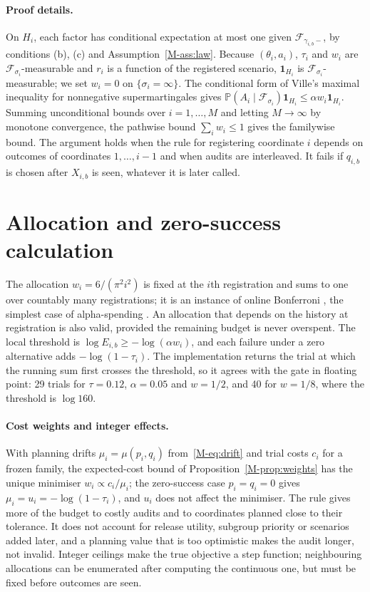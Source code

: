 \documentclass{jpc}
\newcommand{\F}{\mathcal F}
\newcommand{\Prob}{\mathbb P}
\begin{document}
\paragraph{Proof details.} On $H_i$, each factor has conditional expectation at most one given $\F_{\gamma_{i,b}-}$, by conditions (b), (c) and Assumption~\ref{M-ass:law}. Because $(\theta_i,a_i)$, $\tau_i$ and $w_i$ are $\F_{\sigma_i}$-measurable and $r_i$ is a function of the registered scenario, $\mathbf 1_{H_i}$ is $\F_{\sigma_i}$-measurable; we set $w_i=0$ on $\{\sigma_i=\infty\}$. The conditional form of Ville's maximal inequality for nonnegative supermartingales \cite{ville1939} gives $\Prob(A_i\mid\F_{\sigma_i})\mathbf 1_{H_i}\le\alpha w_i\mathbf 1_{H_i}$. Summing unconditional bounds over $i=1,\ldots,M$ and letting $M\to\infty$ by monotone convergence, the pathwise bound $\sum_iw_i\le1$ gives the familywise bound. The argument holds when the rule for registering coordinate $i$ depends on outcomes of coordinates $1,\ldots,i-1$ and when audits are interleaved. It fails if $q_{i,b}$ is chosen after $X_{i,b}$ is seen, whatever it is later called.

\section{Allocation and zero-success calculation}\label{sec:s-allocation}
The allocation $w_i=6/(\pi^2i^2)$ is fixed at the $i$th registration and sums to one over countably many registrations; it is an instance of online Bonferroni \cite{tian2021}, the simplest case of alpha-spending \cite{foster2008}. An allocation that depends on the history at registration is also valid, provided the remaining budget is never overspent. The local threshold is $\log E_{i,b}\ge-\log(\alpha w_i)$, and each failure under a zero alternative adds $-\log(1-\tau_i)$. The implementation returns the trial at which the running sum first crosses the threshold, so it agrees with the gate in floating point: 29 trials for $\tau=0.12$, $\alpha=0.05$ and $w=1/2$, and 40 for $w=1/8$, where the threshold is $\log160$.

\paragraph{Cost weights and integer effects.} With planning drifts $\mu_i=\mu(p_i,q_i)$ from~\eqref{M-eq:drift} and trial costs $c_i$ for a frozen family, the expected-cost bound of Proposition~\ref{M-prop:weights} has the unique minimiser $w_i\propto c_i/\mu_i$; the zero-success case $p_i=q_i=0$ gives $\mu_i=u_i=-\log(1-\tau_i)$, and $u_i$ does not affect the minimiser. The rule gives more of the budget to costly audits and to coordinates planned close to their tolerance. It does not account for release utility, subgroup priority or scenarios added later, and a planning value that is too optimistic makes the audit longer, not invalid. Integer ceilings make the true objective a step function; neighbouring allocations can be enumerated after computing the continuous one, but must be fixed before outcomes are seen.
\end{document}
